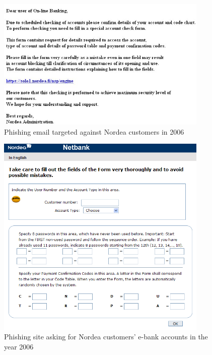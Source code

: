 \documentclass[english,gradu]{tktltiki}
\begin{document}
          \begin{figure}
            \centering
            \includegraphics[width=0.9\textwidth]{images/nordea_phishing_email.jpg}
            \caption{Phishing email targeted against Nordea customers in 2006}
            \label{fig:nordea_phishing_email}
          \end{figure}

          \begin{figure}
            \centering
            \includegraphics[width=0.9\textwidth]{images/nordea_phishing_website.png}
            \caption{Phishing site asking for Nordea customers' e-bank accounts in the year 2006}
            \label{fig:nordea_phishing_website}
          \end{figure}
\end{document}
